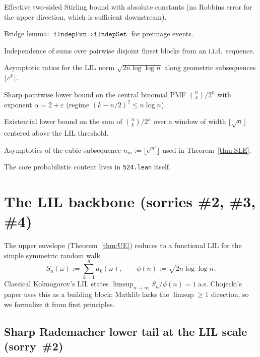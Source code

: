 \documentclass[11pt]{article}
\theoremstyle{plain}
\theoremstyle{definition}
\theoremstyle{remark}
\newcommand{\eps}{\varepsilon}
\newcommand{\as}{\text{a.s.}}
\begin{document}
\begin{description}[labelwidth=4cm,leftmargin=4.5cm,style=nextline]
  \item[\texttt{StirlingTwoSided}] Effective two-sided Stirling bound
    with absolute constants (no Robbins error for the upper direction,
    which is sufficient downstream).
  \item[\texttt{IndepSetBridge}] Bridge lemma:
    $\texttt{iIndepFun}\Rightarrow\texttt{iIndepSet}$ for preimage events.
  \item[\texttt{BlockIndep}] Independence of sums over pairwise disjoint
    finset blocks from an i.i.d.\ sequence.
  \item[\texttt{LilNormAsymptotics}] Asymptotic ratios for the LIL norm
    $\sqrt{2n\log\log n}$ along geometric subsequences $\lfloor c^k\rfloor$.
  \item[\texttt{CentralBinomLower}] Sharp pointwise lower bound on the
    central binomial PMF $\binom{n}{k}/2^n$ with exponent $\alpha = 2 +
    \eps$ (regime $(k-n/2)^2 \le n\log n$).
  \item[\texttt{CentralBinomWindowSum}] Existential lower bound on the
    sum of $\binom{n}{k}/2^n$ over a window of width
    $\lfloor\sqrt n\rfloor$ centered above the LIL threshold.
  \item[\texttt{CubicSubseqAsymptotics}] Asymptotics of the cubic
    subsequence $n_m := \lfloor e^{m^3}\rfloor$ used in
    Theorem~\ref{thm:SLE}.
\end{description}

The core probabilistic content lives in \texttt{524.lean} itself.

\section{The LIL backbone (sorries \#2, \#3, \#4)}

The upper envelope (Theorem~\ref{thm:UE}) reduces to a functional LIL for
the simple symmetric random walk
\[
  S_n(\omega) := \sum_{k=1}^n a_k(\omega),
  \qquad \phi(n) := \sqrt{2n\log\log n}.
\]
Classical Kolmogorov's LIL states
$\limsup_{n\to\infty} S_n / \phi(n) = 1\ \as$ Chojecki's paper uses this
as a building block; Mathlib lacks the $\limsup\ge 1$ direction, so we
formalize it from first principles.

\subsection{Sharp Rademacher lower tail at the LIL scale (sorry~\#2)}
\end{document}
